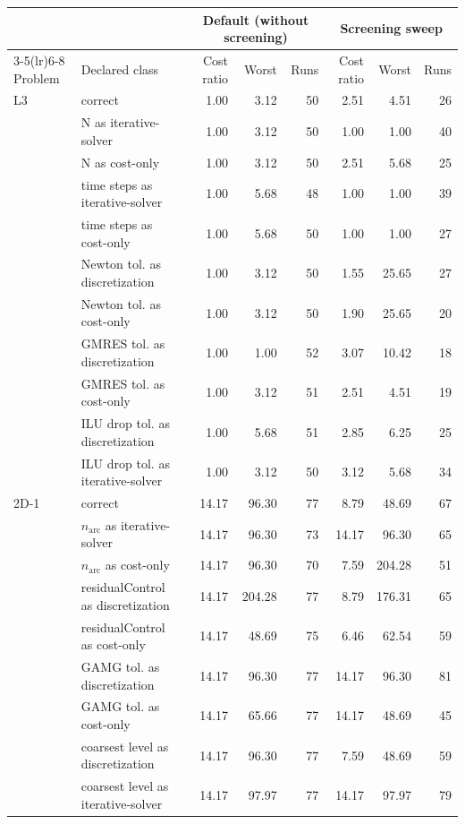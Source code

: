 \begin{tabular}{llrrrrrr}
\toprule
& & \multicolumn{3}{c}{Default (without screening)} & \multicolumn{3}{c}{Screening sweep} \\
\cmidrule(lr){3-5}\cmidrule(lr){6-8}
Problem & Declared class & Cost ratio & Worst & Runs & Cost ratio & Worst & Runs \\
\midrule
L3 & correct & 1.00 & 3.12 & 50 & 2.51 & 4.51 & 26 \\
 & N as iterative-solver & 1.00 & 3.12 & 50 & 1.00 & 1.00 & 40 \\
 & N as cost-only & 1.00 & 3.12 & 50 & 2.51 & 5.68 & 25 \\
 & time steps as iterative-solver & 1.00 & 5.68 & 48 & 1.00 & 1.00 & 39 \\
 & time steps as cost-only & 1.00 & 5.68 & 50 & 1.00 & 1.00 & 27 \\
 & Newton tol. as discretization & 1.00 & 3.12 & 50 & 1.55 & 25.65 & 27 \\
 & Newton tol. as cost-only & 1.00 & 3.12 & 50 & 1.90 & 25.65 & 20 \\
 & GMRES tol. as discretization & 1.00 & 1.00 & 52 & 3.07 & 10.42 & 18 \\
 & GMRES tol. as cost-only & 1.00 & 3.12 & 51 & 2.51 & 4.51 & 19 \\
 & ILU drop tol. as discretization & 1.00 & 5.68 & 51 & 2.85 & 6.25 & 25 \\
 & ILU drop tol. as iterative-solver & 1.00 & 3.12 & 50 & 3.12 & 5.68 & 34 \\
\addlinespace[2pt]
2D-1 & correct & 14.17 & 96.30 & 77 & 8.79 & 48.69 & 67 \\
 & $n_\mathrm{arc}$ as iterative-solver & 14.17 & 96.30 & 73 & 14.17 & 96.30 & 65 \\
 & $n_\mathrm{arc}$ as cost-only & 14.17 & 96.30 & 70 & 7.59 & 204.28 & 51 \\
 & residualControl as discretization & 14.17 & 204.28 & 77 & 8.79 & 176.31 & 65 \\
 & residualControl as cost-only & 14.17 & 48.69 & 75 & 6.46 & 62.54 & 59 \\
 & GAMG tol. as discretization & 14.17 & 96.30 & 77 & 14.17 & 96.30 & 81 \\
 & GAMG tol. as cost-only & 14.17 & 65.66 & 77 & 14.17 & 48.69 & 45 \\
 & coarsest level as discretization & 14.17 & 96.30 & 77 & 7.59 & 48.69 & 59 \\
 & coarsest level as iterative-solver & 14.17 & 97.97 & 77 & 14.17 & 97.97 & 79 \\
\bottomrule
\end{tabular}
